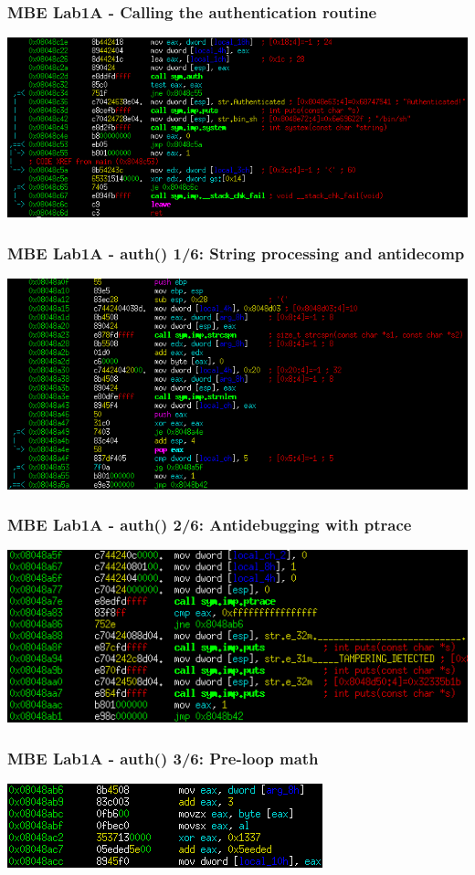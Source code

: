 \documentclass[aspectratio=169]{beamer}
\begin{document}
\begin{frame}[fragile]
\frametitle{MBE Lab1A - Calling the authentication routine}
\includegraphics[width=0.9\paperwidth]{pictures/intel/mbe_lab1a_call_auth.png}
\end{frame}

\begin{frame}[fragile]
\frametitle{MBE Lab1A - auth() 1/6: String processing and antidecomp}
\includegraphics[width=0.9\paperwidth]{pictures/intel/mbe_lab1a_auth_chunk1.png}
\end{frame}

\begin{frame}[fragile]
\frametitle{MBE Lab1A - auth() 2/6: Antidebugging with ptrace}
\includegraphics[width=0.9\paperwidth]{pictures/intel/mbe_lab1a_auth_chunk2.png}
\end{frame}

\begin{frame}[fragile]
\frametitle{MBE Lab1A - auth() 3/6: Pre-loop math}
\includegraphics[width=0.9\paperwidth]{pictures/intel/mbe_lab1a_auth_chunk3.png}
\end{frame}
\end{document}
